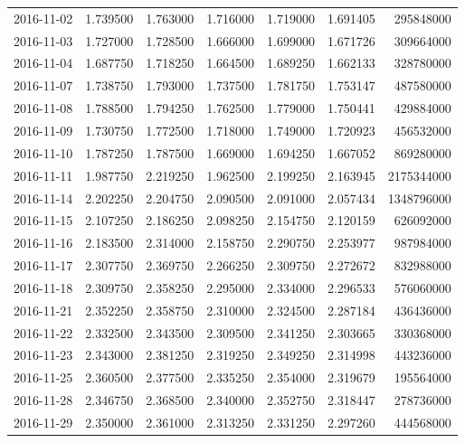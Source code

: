 \begin{tabular}{lrrrrrr}
2016-11-02 &    1.739500 &    1.763000 &    1.716000 &    1.719000 &    1.691405 &   295848000 \\
2016-11-03 &    1.727000 &    1.728500 &    1.666000 &    1.699000 &    1.671726 &   309664000 \\
2016-11-04 &    1.687750 &    1.718250 &    1.664500 &    1.689250 &    1.662133 &   328780000 \\
2016-11-07 &    1.738750 &    1.793000 &    1.737500 &    1.781750 &    1.753147 &   487580000 \\
2016-11-08 &    1.788500 &    1.794250 &    1.762500 &    1.779000 &    1.750441 &   429884000 \\
2016-11-09 &    1.730750 &    1.772500 &    1.718000 &    1.749000 &    1.720923 &   456532000 \\
2016-11-10 &    1.787250 &    1.787500 &    1.669000 &    1.694250 &    1.667052 &   869280000 \\
2016-11-11 &    1.987750 &    2.219250 &    1.962500 &    2.199250 &    2.163945 &  2175344000 \\
2016-11-14 &    2.202250 &    2.204750 &    2.090500 &    2.091000 &    2.057434 &  1348796000 \\
2016-11-15 &    2.107250 &    2.186250 &    2.098250 &    2.154750 &    2.120159 &   626092000 \\
2016-11-16 &    2.183500 &    2.314000 &    2.158750 &    2.290750 &    2.253977 &   987984000 \\
2016-11-17 &    2.307750 &    2.369750 &    2.266250 &    2.309750 &    2.272672 &   832988000 \\
2016-11-18 &    2.309750 &    2.358250 &    2.295000 &    2.334000 &    2.296533 &   576060000 \\
2016-11-21 &    2.352250 &    2.358750 &    2.310000 &    2.324500 &    2.287184 &   436436000 \\
2016-11-22 &    2.332500 &    2.343500 &    2.309500 &    2.341250 &    2.303665 &   330368000 \\
2016-11-23 &    2.343000 &    2.381250 &    2.319250 &    2.349250 &    2.314998 &   443236000 \\
2016-11-25 &    2.360500 &    2.377500 &    2.335250 &    2.354000 &    2.319679 &   195564000 \\
2016-11-28 &    2.346750 &    2.368500 &    2.340000 &    2.352750 &    2.318447 &   278736000 \\
2016-11-29 &    2.350000 &    2.361000 &    2.313250 &    2.331250 &    2.297260 &   444568000 \\

\end{tabular}

